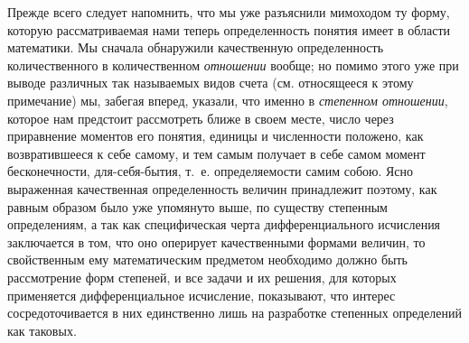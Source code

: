 Прежде всего следует напомнить, что мы уже разъяснили мимоходом ту форму,
которую рассматриваемая нами теперь определенность понятия имеет в области
математики. Мы сначала обнаружили качественную определенность
количественного в количественном {\em отношении}
вообще; но помимо этого уже при выводе различных так называемых видов счета
(см. относящееся к этому примечание) мы, забегая вперед, указали, что
именно в {\em степенном отношении}, которое нам
предстоит рассмотреть ближе в своем месте, число через приравнение моментов
его понятия, единицы и численности положено, как возвратившееся к себе
самому, и тем самым получает в себе самом момент бесконечности,
для-себя-бытия, т.~е. определяемости самим собою. Ясно выраженная
качественная определенность величин принадлежит поэтому, как равным образом
было уже упомянуто выше, по существу степенным определениям, а так как
специфическая черта дифференциального исчисления заключается в том, что оно
оперирует качественными формами величин, то свойственным ему математическим
предметом необходимо должно быть рассмотрение форм степеней, и все задачи и
их решения, для которых применяется дифференциальное исчисление, показывают,
что интерес сосредоточивается в них единственно лишь на разработке
степенных определений как таковых.

